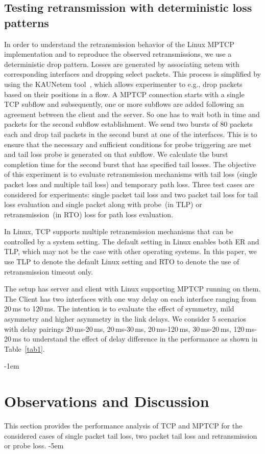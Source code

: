 \documentclass[10pt,conference,compsoc]{IEEEtran}
\begin{document}
\subsection{Testing retransmission with deterministic loss patterns}
In order to understand the retransmission behavior of the Linux MPTCP implementation and to reproduce the observed retransmissions, we use a deterministic drop pattern.
Losses are generated by associating netem with corresponding interfaces and dropping select packets. This process is simplified by using the KAUNetem tool~\cite{Garcia2016}, which allows experimenter to e.g., drop packets based on their positions in a flow. A MPTCP connection starts with a single TCP subflow and subsequently, one or more subflows are added following an agreement between the client and the server. So one has to wait both in time and packets for the second subflow establishment. We send two bursts of 80 packets each and drop tail packets in the second burst at one of the interfaces. This is to ensure that the necessary and sufficient conditions for probe triggering are met and tail loss probe is generated on that subflow. We calculate the burst completion time for the second burst that has specified tail losses. The objective of this experiment is to evaluate retransmission mechanisms with tail loss (single packet loss and multiple tail loss) and temporary path loss. Three test cases are considered for experiments: single packet tail loss and two packet tail loss for tail loss evaluation and single packet along with probe~(in TLP) or retransmission~(in RTO) loss for path loss evaluation. 

In Linux, TCP supports multiple retransmission mechanisms that can be controlled by a system setting. The default setting in Linux enables both
ER and TLP, which may not be the case with other operating systems. In this paper, we use TLP to denote the default Linux setting and RTO to denote the use of retransmission timeout only.

The setup has server and client with Linux supporting MPTCP running on them. The Client has two interfaces with one way delay on each interface ranging from 20\,ms to 120\,ms. The intention is to evaluate the effect of symmetry, mild asymmetry and higher asymmetry in the link delays. We consider 5 scenarios with delay pairings 20\,ms-20\,ms, 20\,ms-30\,ms, 20\,ms-120\,ms, 30\,ms-20\,ms, 120\,ms-20\,ms to understand the effect of delay difference in the performance as shown in Table~\ref{tab1}.

\kern-1em
\section{Observations and Discussion}\label{disc}
This section provides the performance analysis of TCP and MPTCP for the considered cases of single packet tail loss, two packet tail loss and retransmission or probe loss.
\kern-5em
\end{document}
